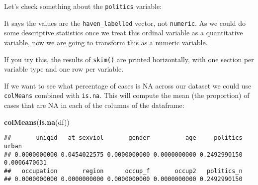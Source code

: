 \documentclass[
]{book}
\newenvironment{Shaded}{\begin{snugshade}}{\end{snugshade}}
\newcommand{\FunctionTok}[1]{\textcolor[rgb]{0.13,0.29,0.53}{\textbf{#1}}}
\newcommand{\NormalTok}[1]{#1}
\newcommand{\OtherTok}[1]{\textcolor[rgb]{0.56,0.35,0.01}{#1}}
\newcommand{\SpecialCharTok}[1]{\textcolor[rgb]{0.81,0.36,0.00}{\textbf{#1}}}
\begin{document}
Let's check something about the \texttt{politics} variable:

\begin{Shaded}
\end{Shaded}

It says the values are the \texttt{haven\_labelled} vector, not \texttt{numeric}. As we could do some descriptive statistics once we treat this ordinal variable as a quantitative variable, now we are going to transform this as a numeric variable.

\begin{Shaded}
\end{Shaded}

If you try this, the results of \texttt{skim()} are printed horizontally, with one section per variable type and one row per variable.

\begin{Shaded}
\end{Shaded}

If we want to see what percentage of cases is NA across our dataset we could use \texttt{colMeans} combined with \texttt{is.na}. This will compute the mean (the proportion) of cases that are NA in each of the columns of the dataframe:

\begin{Shaded}
\begin{Highlighting}[]
\FunctionTok{colMeans}\NormalTok{(}\FunctionTok{is.na}\NormalTok{(df))}
\end{Highlighting}
\end{Shaded}

\begin{verbatim}
##       uniqid   at_sexviol       gender          age     politics        urban 
## 0.0000000000 0.0454022575 0.0000000000 0.0000000000 0.2492990150 0.0006470631 
##   occupation       region      occup_f       occup2   politics_n 
## 0.0000000000 0.0000000000 0.0000000000 0.0000000000 0.2492990150
\end{verbatim}
\end{document}
